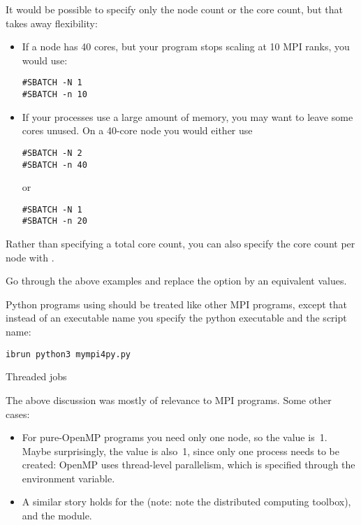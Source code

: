 It would be possible to specify only the node count or the core count,
but that takes away flexibility:
\begin{itemize}
\item If a node has 40 cores, but your program stops scaling at  10 MPI ranks,
  you would use:
\begin{verbatim}
#SBATCH -N 1
#SBATCH -n 10
\end{verbatim}
\item If your processes use a large amount of memory, you may want to leave some cores unused.
  On a 40-core node you would either use
\begin{verbatim}
#SBATCH -N 2
#SBATCH -n 40
\end{verbatim}
or 
\begin{verbatim}
#SBATCH -N 1
#SBATCH -n 20
\end{verbatim}
\end{itemize}

Rather than specifying a total core count, you can also specify the core count
per node with .

\begin{exercise}
  Go through the above examples and replace the  option by an equivalent
   values.
\end{exercise}

\begin{pythonnote}
  Python programs using  should be treated like other
  MPI programs, except that instead of an executable name you specify
  the python executable and the script name:
\begin{verbatim}
ibrun python3 mympi4py.py
\end{verbatim}
\end{pythonnote}

 {Threaded jobs}

The above discussion was mostly of relevance to MPI programs.
Some other cases:
\begin{itemize}
\item For pure-OpenMP programs you need only one node, so the  value is~1.
  Maybe surprisingly, the  value is also~1, since only one process needs
  to be created: OpenMP uses thread-level parallelism, which is specified
  through the  environment variable.
\item A similar story holds for the
  (note: note the distributed computing toolbox),
  and the  module.
\end{itemize}

